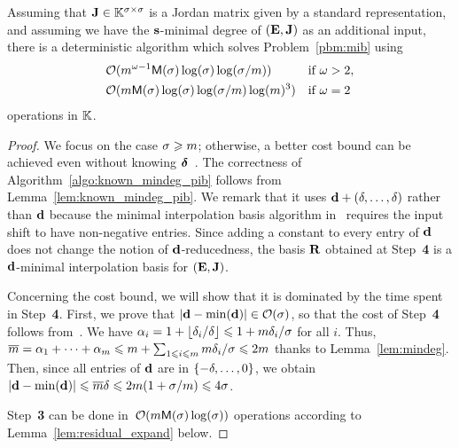 \documentclass[preprint]{sig-alternate-05-2015}
\begin{document}
\begin{prop}
  \label{prop:known_mindeg_pib}
  Assuming that $\mulmat\in\matSpace[\order]$ is a Jordan matrix given by a
  standard representation, and assuming we have the $\shifts$-minimal degree of
  $(\evMat,\mulmat)$ as an additional input, there is a deterministic algorithm
   which solves Problem~\ref{pbm:mib} using
  \begin{align*}
    \bigO{ & \rdim^{\expmatmul-1} \polmultime{\order} \log(\order) \log(\order/\rdim) }
    & \text{if } \expmatmul>2, \\
    \bigO{ & \rdim \polmultime{\order} \log(\order) \log(\order/\rdim) \log(\rdim)^3 }
    & \text{if } \expmatmul=2\;
  \end{align*}
  operations in $\field$.
\end{prop}
\begin{proof}
  We focus on the case $\order \ge \rdim$; otherwise, a better cost bound can
  be achieved even without knowing $\minDegs$~\cite[Theorem~1.4]{JeNeScVi15}.
  The correctness of Algorithm~\ref{algo:known_mindeg_pib} follows from
  Lemma~\ref{lem:known_mindeg_pib}. We remark that it uses $\shifts[d] +
  (\degExp,\ldots,\degExp)$ rather than $\shifts[d]$ because the minimal
  interpolation basis algorithm in~\cite{JeNeScVi15} requires the input shift
  to have non-negative entries. Since adding a constant to every entry of
  $\shifts[d]$ does not change the notion of $\shifts[d]$-reducedness, the
  basis $\mat{R}$ obtained at Step~\textbf{4} is a $\shifts[d]$-minimal
  interpolation basis for $(\evMat,\mulmat)$.

  Concerning the cost bound, we will show that it is dominated by the time
  spent in Step~\textbf{4}. First, we prove that
  $\sshifts[{\shifts[d]-\min(\shifts[d])}] \in \bigO{\order}$, so that the cost
  of Step~\textbf{4} follows from~\cite[Theorem~1.5]{JeNeScVi15}. We have
  $\quoExp_i = 1 + \lfloor \minDeg_i / \degExp \rfloor \le 1 + \rdim \minDeg_i
  / \order$ for all $i$. Thus, $\expand{\rdim} = \quoExp_1 + \cdots +
  \quoExp_\rdim \le \rdim + \sum_{1\le i\le \rdim} \rdim \minDeg_i / \order \le
  2\rdim$ thanks to Lemma~\ref{lem:mindeg}. Then, since all entries of
  $\shifts[d]$ are in $\{-\degExp,\ldots,0\}$, we obtain
  $\sshifts[{\shifts[d]-\min(\shifts[d])}] \le \expand{\rdim} \degExp \le 2
  \rdim (1 + \order/\rdim) \le 4 \order$. 

  Step~\textbf{3} can be done in~$\bigO{ \rdim \polmultime{\order}
\log(\order)}$ operations according to Lemma~\ref{lem:residual_expand} below.


\end{proof}
\end{document}

